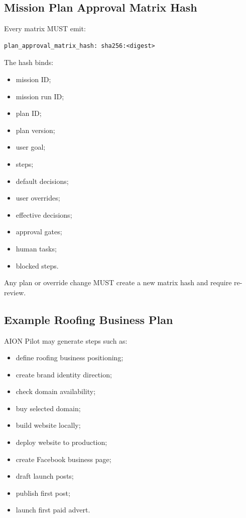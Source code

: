 \subsection{Mission Plan Approval Matrix Hash}

Every matrix MUST emit:

\begin{verbatim}
plan_approval_matrix_hash: sha256:<digest>
\end{verbatim}

The hash binds:

\begin{itemize}
  \item mission ID;
  \item mission run ID;
  \item plan ID;
  \item plan version;
  \item user goal;
  \item steps;
  \item default decisions;
  \item user overrides;
  \item effective decisions;
  \item approval gates;
  \item human tasks;
  \item blocked steps.
\end{itemize}

Any plan or override change MUST create a new matrix hash and require re-review.

\subsection{Example Roofing Business Plan}

AION Pilot may generate steps such as:

\begin{itemize}
  \item define roofing business positioning;
  \item create brand identity direction;
  \item check domain availability;
  \item buy selected domain;
  \item build website locally;
  \item deploy website to production;
  \item create Facebook business page;
  \item draft launch posts;
  \item publish first post;
  \item launch first paid advert.
\end{itemize}

